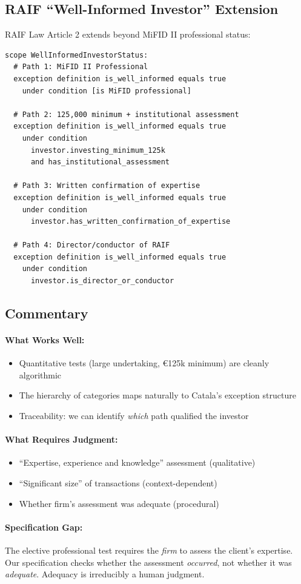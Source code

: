 \subsection{RAIF ``Well-Informed Investor'' Extension}
\label{sec:well-informed}

RAIF Law Article 2 extends beyond MiFID II professional status:

\begin{lstlisting}
scope WellInformedInvestorStatus:
  # Path 1: MiFID II Professional
  exception definition is_well_informed equals true
    under condition [is MiFID professional]
    
  # Path 2: 125,000 minimum + institutional assessment
  exception definition is_well_informed equals true
    under condition
      investor.investing_minimum_125k
      and has_institutional_assessment

  # Path 3: Written confirmation of expertise
  exception definition is_well_informed equals true
    under condition
      investor.has_written_confirmation_of_expertise

  # Path 4: Director/conductor of RAIF
  exception definition is_well_informed equals true
    under condition
      investor.is_director_or_conductor
\end{lstlisting}

\subsection{Commentary}
\label{sec:investor-commentary}

\paragraph{What Works Well:}
\begin{itemize}
  \item Quantitative tests (large undertaking, €125k minimum) are cleanly algorithmic
  \item The hierarchy of categories maps naturally to Catala's exception structure
  \item Traceability: we can identify \textit{which} path qualified the investor
\end{itemize}

\paragraph{What Requires Judgment:}
\begin{itemize}
  \item ``Expertise, experience and knowledge'' assessment (qualitative)
  \item ``Significant size'' of transactions (context-dependent)
  \item Whether firm's assessment was adequate (procedural)
\end{itemize}

\paragraph{Specification Gap:} The elective professional test requires the \textit{firm} to assess the client's expertise. Our specification checks whether the assessment \textit{occurred}, not whether it was \textit{adequate}. Adequacy is irreducibly a human judgment.
